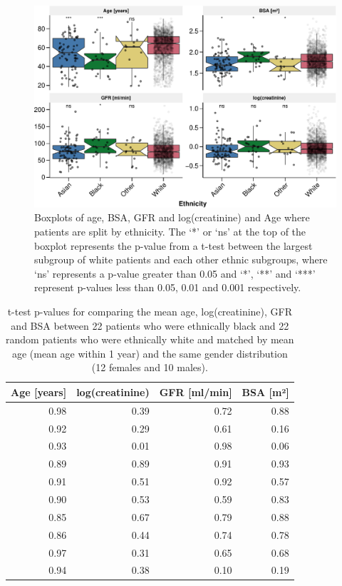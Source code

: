 \documentclass[11pt,]{article}
\begin{document}
\begin{figure}
\centering
\includegraphics{1_Validation_nonIDMS_files/figure-latex/Ethnicity_boxplot-1.pdf}
\caption{\label{fig:boxplot_race}Boxplots of age, BSA, GFR and
log(creatinine) and Age where patients are split by ethnicity. The `*'
or `ns' at the top of the boxplot represents the p-value from a t-test
between the largest subgroup of white patients and each other ethnic
subgroups, where `ns' represents a p-value greater than 0.05 and `*',
`**' and `***' represent p-values less than 0.05, 0.01 and 0.001
respectively.}
\end{figure}

\begin{table}

\caption{\label{tab:ethnicity_matched_sampling}\label{tab:race_resample}t-test p-values for comparing the mean age, log(creatinine), GFR and BSA between 22 patients who were ethnically black and 22 random patients who were ethnically white and matched by mean age (mean age within 1 year) and the same gender distribution (12 females and 10 males).}
\centering
\begin{tabular}[t]{r|r|r|r}
\hline
Age [years] & log(creatinine) & GFR [ml/min] & BSA [m²]\\
\hline
0.98 & 0.39 & 0.72 & 0.88\\
\hline
0.92 & 0.29 & 0.61 & 0.16\\
\hline
0.93 & 0.01 & 0.98 & 0.06\\
\hline
0.89 & 0.89 & 0.91 & 0.93\\
\hline
0.91 & 0.51 & 0.92 & 0.57\\
\hline
0.90 & 0.53 & 0.59 & 0.83\\
\hline
0.85 & 0.67 & 0.79 & 0.88\\
\hline
0.86 & 0.44 & 0.74 & 0.78\\
\hline
0.97 & 0.31 & 0.65 & 0.68\\
\hline
0.94 & 0.38 & 0.10 & 0.19\\
\hline
\end{tabular}
\end{table}
\end{document}
